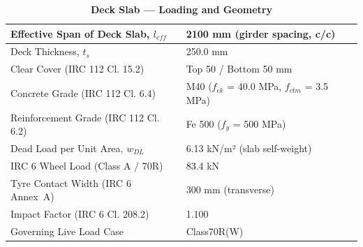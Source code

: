 \documentclass[12pt,a4paper]{report}
\numberwithin{table}{chapter}
\numberwithin{figure}{chapter}
\begin{document}
\vspace{1em}
\begin{longtable}{|L{5.5cm}|p{10.0cm}|}
\caption{\textbf{Deck Slab --- Loading and Geometry}}
\hline
\textnormal{Effective Span of Deck Slab, $l_{eff}$} & 2100 mm (girder spacing, c/c) \\[6pt]
\hline
\textnormal{Deck Thickness, $t_s$} & 250.0 mm \\[6pt]
\hline
\textnormal{Clear Cover (IRC 112 Cl. 15.2)} & Top 50 / Bottom 50 mm \\[6pt]
\hline
\textnormal{Concrete Grade (IRC 112 Cl. 6.4)} & M40 ($f_{ck}$ = 40.0 MPa, $f_{ctm}$ = 3.5 MPa) \\[6pt]
\hline
\textnormal{Reinforcement Grade (IRC 112 Cl. 6.2)} & Fe 500 ($f_y$ = 500 MPa) \\[6pt]
\hline
\textnormal{Dead Load per Unit Area, $w_{DL}$} & 6.13 kN/m² (slab self-weight) \\[6pt]
\hline
\textnormal{IRC 6 Wheel Load (Class A / 70R)} & 83.4 kN \\[6pt]
\hline
\textnormal{Tyre Contact Width (IRC 6 Annex~A)} & 300 mm (transverse) \\[6pt]
\hline
\textnormal{Impact Factor (IRC 6 Cl. 208.2)} & 1.100 \\[6pt]
\hline
\textnormal{Governing Live Load Case} & Class70R(W) \\[6pt]
\hline
\end{longtable}
\end{document}
